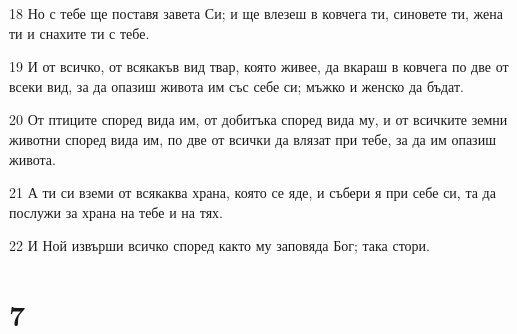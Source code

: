 \par 18 Но с тебе ще поставя завета Си; и ще влезеш в ковчега ти, синовете ти, жена ти и снахите ти с тебе.
\par 19 И от всичко, от всякакъв вид твар, която живее, да вкараш в ковчега по две от всеки вид, за да опазиш живота им със себе си; мъжко и женско да бъдат.
\par 20 От птиците според вида им, от добитъка според вида му, и от всичките земни животни според вида им, по две от всички да влязат при тебе, за да им опазиш живота.
\par 21 А ти си вземи от всякаква храна, която се яде, и събери я при себе си, та да послужи за храна на тебе и на тях.
\par 22 И Ной извърши всичко според както му заповяда Бог; така стори.

\chapter{7}

